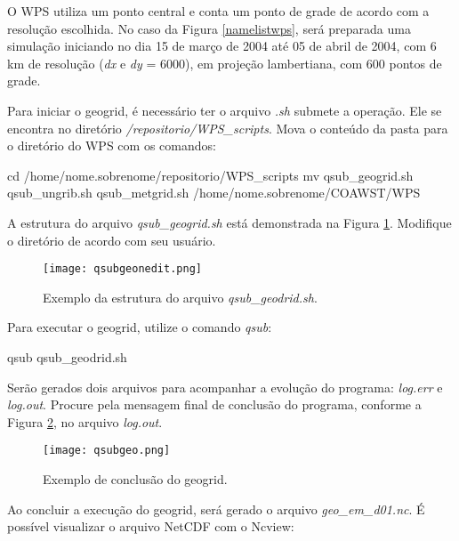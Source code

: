 \noindent O WPS utiliza um ponto central e conta um ponto de grade de acordo com a resolução escolhida. No caso da Figura \textcolor{bleu_cite}{\ref{namelistwps}}, será preparada uma simulação iniciando no dia 15 de março de 2004 até 05 de abril de 2004, com 6 km de resolução (\textit{dx} e \textit{dy} = 6000), em projeção lambertiana, com 600 pontos de grade.
\bigskip

\noindent Para iniciar o geogrid, é necessário ter o arquivo \textit{.sh} submete a operação. Ele se encontra no diretório \textit{/repositorio/WPS\_scripts}. Mova o conteúdo da pasta para o diretório do WPS com os comandos:
\bigskip

\begin{bashcode}[fontsize=\footnotesize]
cd /home/nome.sobrenome/repositorio/WPS_scripts
mv qsub_geogrid.sh qsub_ungrib.sh qsub_metgrid.sh /home/nome.sobrenome/COAWST/WPS
\end{bashcode}
\bigskip

\noindent A estrutura do arquivo \textit{qsub\_geogrid.sh} está demonstrada na Figura \textcolor{bleu_cite}{\ref{qsubgeonedit}}. Modifique o diretório de acordo com seu usuário.
\bigskip

\begin{figure}[H]
    \centering
    \texttt{[image: qsubgeonedit.png]}
    \caption{Exemplo da estrutura do arquivo \textit{qsub\_geodrid.sh}.}
    \label{qsubgeonedit}
\end{figure}
\bigskip

\noindent Para executar o geogrid, utilize o comando \textit{qsub}:
\bigskip

\begin{bashcode}
qsub qsub_geodrid.sh
\end{bashcode}
\bigskip

\noindent Serão gerados dois arquivos para acompanhar a evolução do programa: \textit{log.err} e \textit{log.out}. Procure pela mensagem final de conclusão do programa, conforme a Figura \textcolor{bleu_cite}{\ref{qsubgeofinal}}, no arquivo \textit{log.out}.
\bigskip

\begin{figure}[H]
    \centering
    \texttt{[image: qsubgeo.png]}
    \caption{Exemplo de conclusão do geogrid.}
    \label{qsubgeofinal}
\end{figure}
\bigskip

\noindent Ao concluir a execução do geogrid, será gerado o arquivo \textit{geo\_em\_d01.nc}. É possível visualizar o arquivo NetCDF com o Ncview:
\bigskip

